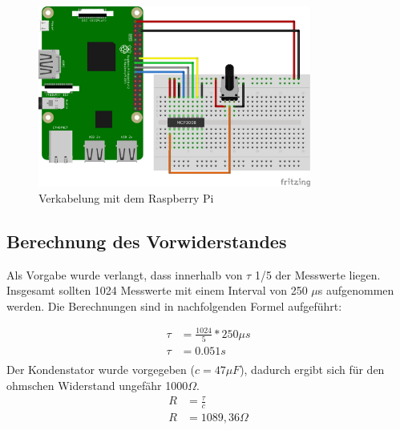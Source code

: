 \documentclass{article}
\begin{document}
\begin{figure}[h!]
    \centering
    \includegraphics[width=0.8\textwidth]{RPi-Fritzing-Potentiometer_bb.png}
    \caption{Verkabelung mit dem Raspberry Pi}
    \label{fig:ADC-Verkabelung}
\end{figure}

\subsection{Berechnung des Vorwiderstandes}
Als Vorgabe wurde verlangt, dass innerhalb von $\tau$ 1/5 der Messwerte liegen. 
Insgesamt sollten 1024 Messwerte mit einem Interval von 250 $\mu$s aufgenommen werden.
Die Berechnungen sind in nachfolgenden Formel aufgeführt:

\begin{align*}
    \tau &=\frac{1024}{5} * 250\mu s\\
    \tau &=0.051s\\
\end{align*}
Der Kondenstator wurde vorgegeben ($c=47\mu F$), dadurch ergibt sich für den ohmschen Widerstand ungefähr 1000$\Omega$.
\begin{align*}
    R &= \frac{\tau}{c}\\
    R &= 1089,36\Omega\\
\end{align*}

\newpage
\end{document}
